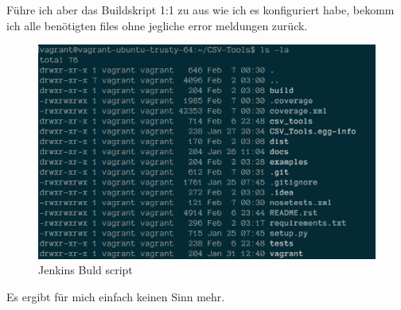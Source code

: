 Führe ich aber das Buildskript 1:1 zu aus wie ich es konfiguriert habe, bekomm ich alle benötigten files ohne jegliche error meldungen zurück.

\begin{figure}[h!]
	\caption{Jenkins Buld script}
	\centering
	\includegraphics[width=\textwidth]{images/vagrant_script.png}
\end{figure}

Es ergibt für mich einfach keinen Sinn mehr.
